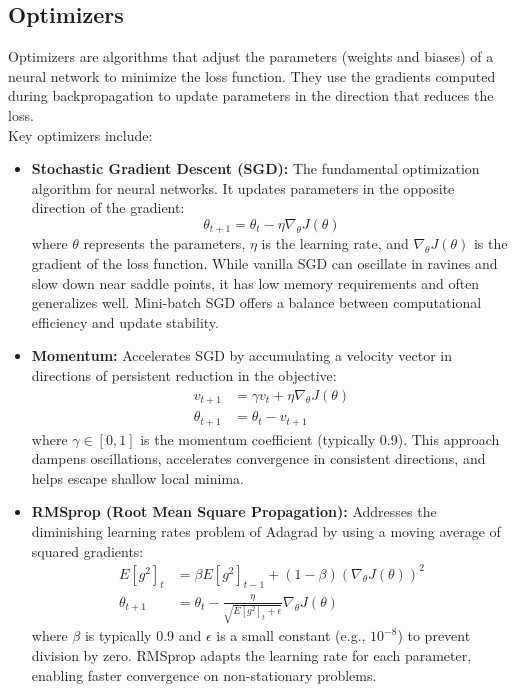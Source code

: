 \documentclass[a4paper, journal]{IEEEtran}
\begin{document}
\subsection{Optimizers}
Optimizers are algorithms that adjust the parameters (weights and biases) of a neural network to minimize the loss function. They use the gradients computed during backpropagation to update parameters in the direction that reduces the loss.
\\
Key optimizers include:
\begin{itemize}
    \item \textbf{Stochastic Gradient Descent (SGD):} The fundamental optimization algorithm for neural networks. It updates parameters in the opposite direction of the gradient:
          \begin{equation}
              \theta_{t+1} = \theta_t - \eta \nabla_\theta J(\theta)
          \end{equation}
          where $\theta$ represents the parameters, $\eta$ is the learning rate, and $\nabla_\theta J(\theta)$ is the gradient of the loss function. While vanilla SGD can oscillate in ravines and slow down near saddle points, it has low memory requirements and often generalizes well. Mini-batch SGD offers a balance between computational efficiency and update stability.

    \item \textbf{Momentum:} Accelerates SGD by accumulating a velocity vector in directions of persistent reduction in the objective:
          \begin{align}
              v_{t+1}      & = \gamma v_t + \eta \nabla_\theta J(\theta) \\
              \theta_{t+1} & = \theta_t - v_{t+1}
          \end{align}
          where $\gamma \in [0,1]$ is the momentum coefficient (typically 0.9). This approach dampens oscillations, accelerates convergence in consistent directions, and helps escape shallow local minima.

    \item \textbf{RMSprop (Root Mean Square Propagation):} Addresses the diminishing learning rates problem of Adagrad by using a moving average of squared gradients:
          \begin{align}
              E[g^2]_t     & = \beta E[g^2]_{t-1} + (1-\beta)(\nabla_\theta J(\theta))^2                  \\
              \theta_{t+1} & = \theta_t - \frac{\eta}{\sqrt{E[g^2]_t + \epsilon}} \nabla_\theta J(\theta)
          \end{align}
          where $\beta$ is typically 0.9 and $\epsilon$ is a small constant (e.g., $10^{-8}$) to prevent division by zero. RMSprop adapts the learning rate for each parameter, enabling faster convergence on non-stationary problems.


\end{itemize}
\end{document}
